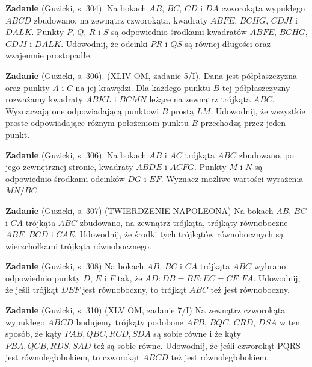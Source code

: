 \textbf{Zadanie} (Guzicki, s. 304).
Na bokach $AB$, $BC$, $CD$ i $DA$ czworokąta wypukłego $ABCD$ zbudowano, na zewnątrz czworokąta, kwadraty $ABFE$, $BCHG$, $CDJI$ i $DALK$.
Punkty $P$, $Q$, $R$ i $S$ są odpowiednio środkami kwadratów $ABFE$, $BCHG$, $CDJI$ i $DALK$.
Udowodnij, że odcinki $PR$ i $QS$ są równej długości oraz wzajemnie prostopadłe.

\textbf{Zadanie} (Guzicki, s. 306).
(XLIV OM, zadanie 5/I).
Dana jest półpłaszczyzna oraz punkty $A$ i $C$ na jej krawędzi.
Dla każdego punktu $B$ tej półpłaszczyzny rozważamy kwadraty $ABKL$ i $BCMN$ leżące na zewnątrz trójkąta $ABC$.
Wyznaczają one odpowiadającą punktowi $B$ prostą $LM$.
Udowodnij, że wszystkie proste odpowiadające różnym położeniom punktu $B$ przechodzą przez jeden punkt.

\textbf{Zadanie} (Guzicki, s. 306).
Na bokach $AB$ i $AC$ trójkąta $ABC$ zbudowano, po jego zewnętrznej stronie, kwadraty $ABDE$ i $ACFG$.
Punkty $M$ i $N$ są odpowiednio środkami odcinków $DG$ i $EF$.
Wyznacz możliwe wartości wyrażenia $MN / BC$.

\textbf{Zadanie} (Guzicki, s. 307)
(TWIERDZENIE NAPOLEONA)
Na bokach $AB$, $BC$ i $CA$ trójkąta $ABC$ zbudowano, na zewnątrz trójkąta, trójkąty równoboczne $ABF$, $BCD$ i $CAE$.
Udowodnij, że środki tych trójkątów równobocznych są wierzchołkami trójkąta równobocznego.

\textbf{Zadanie} (Guzicki, s. 308)
Na bokach $AB$, $BC$ i $CA$ trójkąta $ABC$ wybrano odpowiednio punkty $D$, $E$ i $F$ tak, że $AD : DB = BE : EC = CF : FA$.
Udowodnij, że jeśli trójkąt $DEF$ jest równoboczny, to trójkąt $ABC$ też jest równoboczny.

\textbf{Zadanie} (Guzicki, s. 310)
(XLV OM, zadanie 7/I)
Na zewnątrz czworokąta wypukłego $ABCD$ budujemy trójkąty podobone $APB$, $BQC$, $CRD$, $DSA$ w ten sposób, że kąty $PAB, QBC, RCD, SDA$ są sobie równe i że kąty $PBA, QCB, RDS, SAD$ też są sobie równe.
Udowodnij, że jeśli czworokąt PQRS jest równoległobokiem, to czworokąt $ABCD$ też jest równoległobokiem.